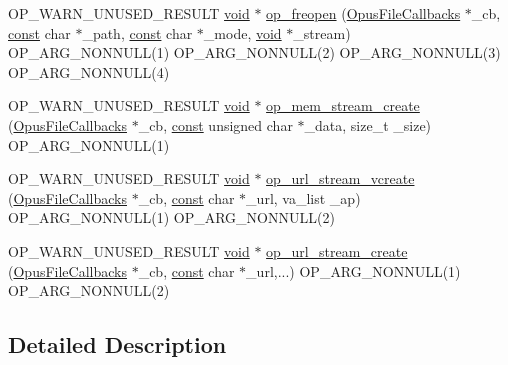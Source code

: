 \begin{DoxyCompactItemize}
\item 
O\+P\+\_\+\+W\+A\+R\+N\+\_\+\+U\+N\+U\+S\+E\+D\+\_\+\+R\+E\+S\+U\+LT \hyperlink{png_8h_ac9c84fa68bbad002983e35ce3663c686}{void} $\ast$ \hyperlink{group__stream__callbacks_gae63ceff71d9602c68f4db1c91b480fde}{op\+\_\+freopen} (\hyperlink{struct_opus_file_callbacks}{Opus\+File\+Callbacks} $\ast$\+\_\+cb, \hyperlink{zconf_8h_a2c212835823e3c54a8ab6d95c652660e}{const} char $\ast$\+\_\+path, \hyperlink{zconf_8h_a2c212835823e3c54a8ab6d95c652660e}{const} char $\ast$\+\_\+mode, \hyperlink{png_8h_ac9c84fa68bbad002983e35ce3663c686}{void} $\ast$\+\_\+stream) O\+P\+\_\+\+A\+R\+G\+\_\+\+N\+O\+N\+N\+U\+LL(1) O\+P\+\_\+\+A\+R\+G\+\_\+\+N\+O\+N\+N\+U\+LL(2) O\+P\+\_\+\+A\+R\+G\+\_\+\+N\+O\+N\+N\+U\+LL(3) O\+P\+\_\+\+A\+R\+G\+\_\+\+N\+O\+N\+N\+U\+LL(4)
\item 
O\+P\+\_\+\+W\+A\+R\+N\+\_\+\+U\+N\+U\+S\+E\+D\+\_\+\+R\+E\+S\+U\+LT \hyperlink{png_8h_ac9c84fa68bbad002983e35ce3663c686}{void} $\ast$ \hyperlink{group__stream__callbacks_ga83231f1733af83c7940b0262f1a1ffb5}{op\+\_\+mem\+\_\+stream\+\_\+create} (\hyperlink{struct_opus_file_callbacks}{Opus\+File\+Callbacks} $\ast$\+\_\+cb, \hyperlink{zconf_8h_a2c212835823e3c54a8ab6d95c652660e}{const} unsigned char $\ast$\+\_\+data, size\+\_\+t \+\_\+size) O\+P\+\_\+\+A\+R\+G\+\_\+\+N\+O\+N\+N\+U\+LL(1)
\item 
O\+P\+\_\+\+W\+A\+R\+N\+\_\+\+U\+N\+U\+S\+E\+D\+\_\+\+R\+E\+S\+U\+LT \hyperlink{png_8h_ac9c84fa68bbad002983e35ce3663c686}{void} $\ast$ \hyperlink{group__stream__callbacks_ga33bf9edd6949f8125456b2c8a1591010}{op\+\_\+url\+\_\+stream\+\_\+vcreate} (\hyperlink{struct_opus_file_callbacks}{Opus\+File\+Callbacks} $\ast$\+\_\+cb, \hyperlink{zconf_8h_a2c212835823e3c54a8ab6d95c652660e}{const} char $\ast$\+\_\+url, va\+\_\+list \+\_\+ap) O\+P\+\_\+\+A\+R\+G\+\_\+\+N\+O\+N\+N\+U\+LL(1) O\+P\+\_\+\+A\+R\+G\+\_\+\+N\+O\+N\+N\+U\+LL(2)
\item 
O\+P\+\_\+\+W\+A\+R\+N\+\_\+\+U\+N\+U\+S\+E\+D\+\_\+\+R\+E\+S\+U\+LT \hyperlink{png_8h_ac9c84fa68bbad002983e35ce3663c686}{void} $\ast$ \hyperlink{group__stream__callbacks_ga5c588fac7542057282b50a5bd2dbb35a}{op\+\_\+url\+\_\+stream\+\_\+create} (\hyperlink{struct_opus_file_callbacks}{Opus\+File\+Callbacks} $\ast$\+\_\+cb, \hyperlink{zconf_8h_a2c212835823e3c54a8ab6d95c652660e}{const} char $\ast$\+\_\+url,...) O\+P\+\_\+\+A\+R\+G\+\_\+\+N\+O\+N\+N\+U\+LL(1) O\+P\+\_\+\+A\+R\+G\+\_\+\+N\+O\+N\+N\+U\+LL(2)
\end{DoxyCompactItemize}


\subsection{Detailed Description}


